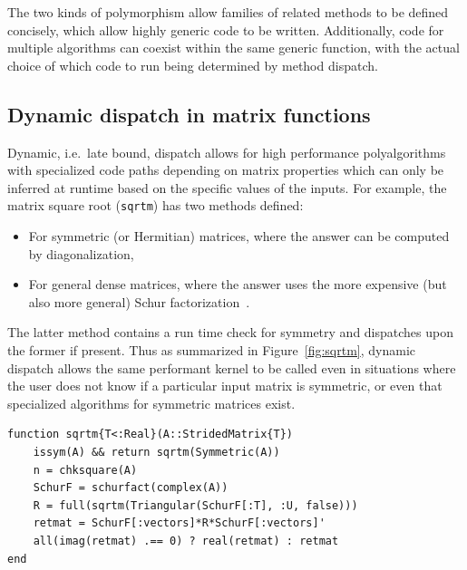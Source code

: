 The two kinds of polymorphism allow families of related methods to be defined
concisely, which allow highly generic code to be written. Additionally, code for
multiple algorithms can coexist within the same generic function, with the actual
choice of which code to run being determined by method dispatch.



\subsection{Dynamic dispatch in matrix functions}

Dynamic, i.e.\ late bound, dispatch allows for high performance
polyalgorithms with specialized code paths depending on matrix properties which
can only be inferred at runtime based on the specific values of the inputs. For
example, the matrix square root (\verb|sqrtm|) has two methods defined:

\begin{itemize}
	\item For symmetric (or Hermitian) matrices, where the answer can be
		computed by diagonalization,
	\item For general dense matrices, where the answer uses the more
		expensive (but also more general) Schur
		factorization~\cite{Higham2008}.
\end{itemize}
%
The latter method contains a run time check for symmetry and dispatches upon
the former if present. Thus as summarized in Figure~\ref{fig:sqrtm}, dynamic
dispatch allows the same performant kernel to be called even in situations
where the user does not know if a particular input matrix is symmetric, or even
that specialized algorithms for symmetric matrices exist.


\begin{lstlisting}
function sqrtm{T<:Real}(A::StridedMatrix{T})
    issym(A) && return sqrtm(Symmetric(A))
    n = chksquare(A)
    SchurF = schurfact(complex(A))
    R = full(sqrtm(Triangular(SchurF[:T], :U, false)))
    retmat = SchurF[:vectors]*R*SchurF[:vectors]'
    all(imag(retmat) .== 0) ? real(retmat) : retmat
end
\end{lstlisting}


